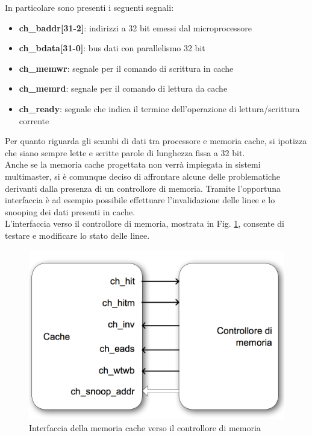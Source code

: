 In particolare sono presenti i seguenti segnali:
\begin{itemize} %
\item \textbf{ch\_baddr[31-2]}: indirizzi a 32 bit emessi dal microprocessore
\item \textbf{ch\_bdata[31-0]}: bus dati con parallelismo 32 bit 
\item \textbf{ch\_memwr}: segnale per il comando di scrittura in cache
\item \textbf{ch\_memrd}: segnale per il comando di lettura da cache
\item \textbf{ch\_ready}: segnale che indica il termine dell'operazione di lettura/scrittura corrente
\end{itemize}

Per quanto riguarda gli scambi di dati tra processore e memoria cache, si ipotizza che siano sempre lette e scritte parole di lunghezza fissa a 32 bit.\\

Anche se la memoria cache progettata non verr\`a impiegata in sistemi multimaster, si \`e comunque deciso di affrontare alcune delle problematiche derivanti dalla presenza di un controllore di memoria. Tramite l'opportuna interfaccia \`e ad esempio possibile effettuare l'invalidazione delle linee e lo snooping dei dati presenti in cache.\\

L'interfaccia verso il controllore di memoria, mostrata in Fig. \ref{fig:int_cnt}, consente di testare e modificare lo stato delle linee.\\

\begin{figure}[h!]
\centering
\includegraphics[width=\textwidth]{img/cache/control.png}
\caption{Interfaccia della memoria cache verso il controllore di memoria}
\label{fig:int_cnt}
\end{figure}

